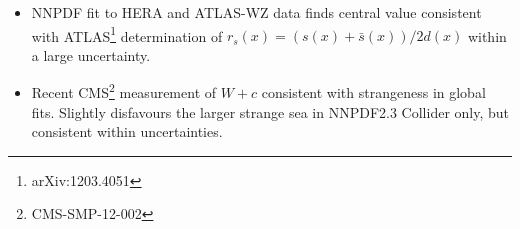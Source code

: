 \documentclass[10pt]{beamer}
\begin{document}
\begin{frame}
\begin{columns}
\begin{column}{0.5\textwidth}
   \end{column}
  \end{columns}
            \vskip10pt
  {\small
  \begin{itemize}
\item<1->NNPDF fit to HERA and ATLAS-WZ data finds central
value consistent with ATLAS\footnote{arXiv:1203.4051} determination of $r_s(x) = (s(x) + \bar{s}(x)) / 2d(x)$ within a large uncertainty.
\item<1->Recent CMS\footnote{CMS-SMP-12-002} measurement of $W+c$ consistent with strangeness in global fits.
Slightly disfavours the larger strange sea in NNPDF2.3 Collider only, but consistent within uncertainties.
\end{itemize}

}

\end{frame}


\end{document}
